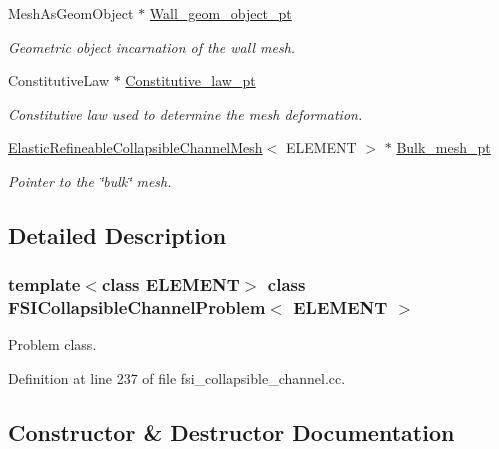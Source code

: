 \begin{DoxyCompactItemize}
Mesh\+As\+Geom\+Object $\ast$ \hyperlink{classFSICollapsibleChannelProblem_a884256a97060121c507ab9673f0ccef6}{Wall\+\_\+geom\+\_\+object\+\_\+pt}
\begin{DoxyCompactList}\small\item\em Geometric object incarnation of the wall mesh. \end{DoxyCompactList}\item 
Constitutive\+Law $\ast$ \hyperlink{classFSICollapsibleChannelProblem_a49de3f64c8f375c2709a2d0f5193cef3}{Constitutive\+\_\+law\+\_\+pt}
\begin{DoxyCompactList}\small\item\em Constitutive law used to determine the mesh deformation. \end{DoxyCompactList}\item 
\hyperlink{classElasticRefineableCollapsibleChannelMesh}{Elastic\+Refineable\+Collapsible\+Channel\+Mesh}$<$ E\+L\+E\+M\+E\+NT $>$ $\ast$ \hyperlink{classFSICollapsibleChannelProblem_ac7c827b880d5499b8c3c4c3c37d6a3c9}{Bulk\+\_\+mesh\+\_\+pt}
\begin{DoxyCompactList}\small\item\em Pointer to the \char`\"{}bulk\char`\"{} mesh. \end{DoxyCompactList}\end{DoxyCompactItemize}


\subsection{Detailed Description}
\subsubsection*{template$<$class E\+L\+E\+M\+E\+NT$>$\newline
class F\+S\+I\+Collapsible\+Channel\+Problem$<$ E\+L\+E\+M\+E\+N\+T $>$}

Problem class. 

Definition at line 237 of file fsi\+\_\+collapsible\+\_\+channel.\+cc.



\subsection{Constructor \& Destructor Documentation}
\mbox{\label{classFSICollapsibleChannelProblem_afe14ae0d2bdfc9a15969c9bdcd6e2512}} 
